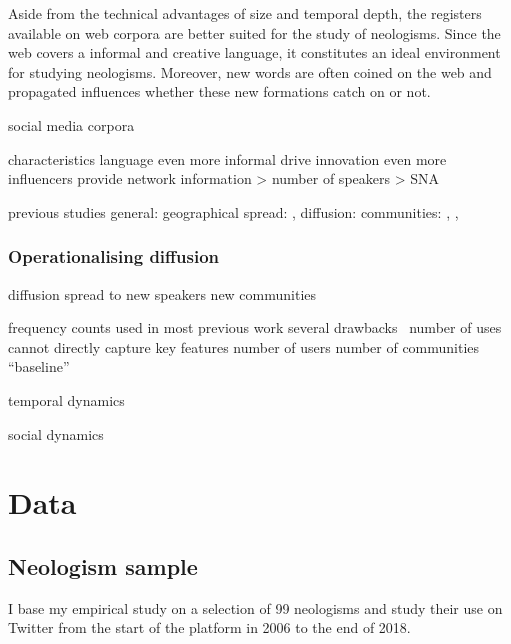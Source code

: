 \documentclass[
  a4paper,
  abstract=on,
  captions=tableabove
  ]{scrartcl}
\begin{document}
      Aside from the technical advantages of size and temporal depth, the registers available on web corpora are better suited for the study of neologisms. Since the web covers a informal and creative language, it constitutes an ideal environment for studying neologisms. Moreover, new words are often coined on the web and propagated
        influences whether these new formations catch on or not.


          social media corpora

            characteristics
              language even more informal
              drive innovation even more
                influencers
              provide network information > number of speakers > SNA

            previous studies
              general: \cite{Grieve2016AnalyzingLexical} 
              geographical spread: \cite{Eisenstein2014DiffusionLexical}, 
              diffusion: \cite{Nini2017ApplicationGrowth} 
              communities: \cite{Stewart2018MakingFetch}, \cite{Ryskina2020WhereNew}, \cite{DelTredici2018RoadSuccess} 
          


    
    \subsubsection{Operationalising diffusion}
    
      diffusion
        spread to
          new speakers
          new communities
          
      frequency counts
        used in most previous work
        several drawbacks~\parencite{Stefanowitsch2017CorpusbasedPerspective}
          number of uses cannot directly capture key features
            number of users
            number of communities
        \enquote{baseline}

      temporal dynamics

      social dynamics
          
\section{Data}
  \label{sec:data}
  \subsection{Neologism sample}
    \label{subsec:neo-sample}

  I base my empirical study on a selection of 99 neologisms and study their use on Twitter from the start of the platform in 2006 to the end of 2018.
\end{document}

